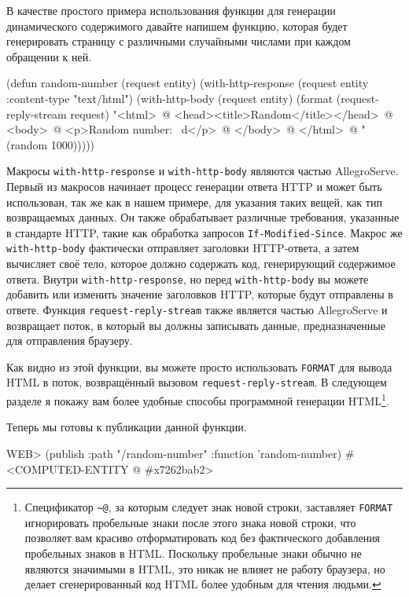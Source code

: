 В качестве простого примера использования функции для генерации динамического
содержимого давайте напишем функцию, которая будет генерировать страницу с различными
случайными числами при каждом обращении к ней.

\begin{myverb}
  (defun random-number (request entity)
    (with-http-response (request entity :content-type "text/html")
      (with-http-body (request entity)
        (format 
         (request-reply-stream request)
         "<html>~@
          <head><title>Random</title></head>~@
          <body>~@
          <p>Random number: ~d</p>~@
          </body>~@
          </html>~@
         "
         (random 1000)))))
\end{myverb}

Макросы \lstinline{with-http-response} и \lstinline{with-http-body} являются частью
AllegroServe. Первый из макросов начинает процесс генерации ответа HTTP и может быть
использован, так же как в нашем примере, для указания таких вещей, как тип возвращаемых
данных. Он также обрабатывает различные требования, указанные в стандарте HTTP, такие как
обработка запросов \lstinline{If-Modified-Since}. Макрос же \lstinline{with-http-body} фактически
отправляет заголовки HTTP-ответа, а затем вычисляет своё тело, которое должно содержать
код, генерирующий содержимое ответа. Внутри \lstinline{with-http-response}, но перед
\lstinline{with-http-body} вы можете добавить или изменить значение заголовков HTTP, которые
будут отправлены в ответе. Функция \lstinline{request-reply-stream} также является частью
AllegroServe и возвращает поток, в который вы должны записывать данные, предназначенные для
отправления браузеру.

Как видно из этой функции, вы можете просто использовать \lstinline{FORMAT} для вывода HTML в
поток, возвращённый вызовом \lstinline{request-reply-stream}. В следующем разделе я покажу вам
более удобные способы программной генерации HTML\footnote{Спецификатор \lstinline{~@}, за
  которым следует знак новой строки, заставляет \lstinline{FORMAT} игнорировать пробельные
  знаки после этого знака новой строки, что позволяет вам красиво отформатировать код без
  фактического добавления пробельных знаков в HTML. Поскольку пробельные знаки обычно не
  являются значимыми в HTML, это никак не влияет не работу браузера, но делает
  сгенерированный код HTML более удобным для чтения людьми.}.

Теперь мы готовы к публикации данной функции.

\begin{myverb}
  WEB> (publish :path "/random-number" :function 'random-number)
  #<COMPUTED-ENTITY @ #x7262bab2>
\end{myverb}

